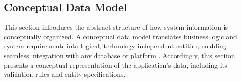 \subsection{Conceptual Data Model}

This section introduces the abstract structure of how system information is conceptually organized. A conceptual data model translates business logic and system requirements into logical, technology-independent entities, enabling seamless integration with any database or platform \cite{larman-uml-patterns}. Accordingly, this section presents a conceptual representation of the application's data, including its validation rules and entity specifications.




